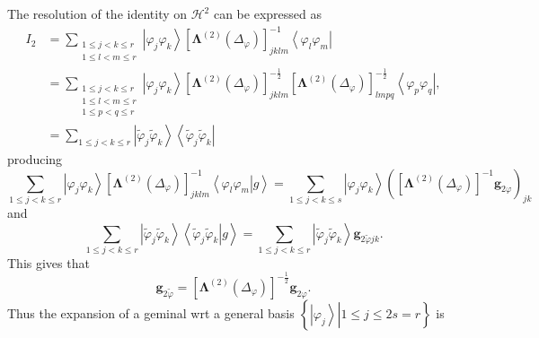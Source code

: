 \documentclass[aps,preprint]{revtex4}%
\begin{document}
The resolution of the identity on $\mathcal{H}^{2}$ can be expressed as
\begin{align}
I_{2}  &  =\sum_{\substack{1\leq j<k\leq r\\1\leq l<m\leq r}}\left\vert
\varphi_{j}\varphi_{k}\right\rangle \left[  \mathbf{\Lambda}^{\left(
2\right)  }\left(  \Delta_{\varphi}\right)  \right]  _{jklm}^{-1}\left\langle
\varphi_{l}\varphi_{m}\right\vert \nonumber\\
&  =\sum_{\substack{1\leq j<k\leq r\\1\leq l<m\leq r\\1\leq p<q\leq
r}}\left\vert \varphi_{j}\varphi_{k}\right\rangle \left[  \mathbf{\Lambda
}^{\left(  2\right)  }\left(  \Delta_{\varphi}\right)  \right]  _{jklm}%
^{-\frac{1}{2}}\left[  \mathbf{\Lambda}^{\left(  2\right)  }\left(
\Delta_{\varphi}\right)  \right]  _{lmpq}^{-\frac{1}{2}}\left\langle
\varphi_{p}\varphi_{q}\right\vert ,\nonumber\\
&  =\sum_{1\leq j<k\leq r}\left\vert \tilde{\varphi}_{j}\tilde{\varphi}%
_{k}\right\rangle \left\langle \tilde{\varphi}_{j}\tilde{\varphi}%
_{k}\right\vert
\end{align}
producing
\begin{equation}
\sum_{1\leq j<k\leq r}\left\vert \varphi_{j}\varphi_{k}\right\rangle \left[
\mathbf{\Lambda}^{\left(  2\right)  }\left(  \Delta_{\varphi}\right)  \right]
_{jklm}^{-1}\left\langle \left.  \varphi_{l}\varphi_{m}\right\vert
g\right\rangle =\sum_{1\leq j<k\leq s}\left\vert \varphi_{j}\varphi
_{k}\right\rangle \left(  \left[  \mathbf{\Lambda}^{\left(  2\right)  }\left(
\Delta_{\varphi}\right)  \right]  ^{-1}\mathbf{g}_{2\varphi}\right)  _{jk}%
\end{equation}
and
\begin{equation}
\sum_{1\leq j<k\leq r}\left\vert \tilde{\varphi}_{j}\tilde{\varphi}%
_{k}\right\rangle \left\langle \left.  \tilde{\varphi}_{j}\tilde{\varphi}%
_{k}\right\vert g\right\rangle =\sum_{1\leq j<k\leq r}\left\vert
\tilde{\varphi}_{j}\tilde{\varphi}_{k}\right\rangle \mathbf{g}_{2\tilde
{\varphi}jk}.
\end{equation}
This gives that
\begin{equation}
\mathbf{g}_{2\tilde{\varphi}}=\left[  \mathbf{\Lambda}^{\left(  2\right)
}\left(  \Delta_{\varphi}\right)  \right]  ^{-\frac{1}{2}}\mathbf{g}%
_{2\varphi}.
\end{equation}
Thus the expansion of a geminal wrt a general basis $\left\{  \left.
\left\vert \varphi_{j}\right\rangle \right\vert 1\leq j\leq2s=r\right\}  $ is
\end{document}
